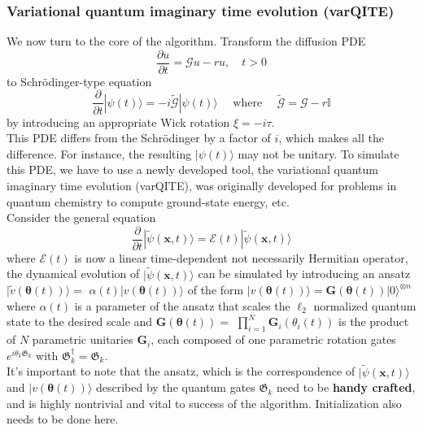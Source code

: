 \documentclass[11pt]{article}
\theoremstyle{definition}
\begin{document}
\subsubsection{Variational quantum imaginary time evolution (varQITE)}
We now turn to the core of the algorithm. Transform the diffusion PDE
$$
\frac{\partial u}{\partial t}=\mathcal{G} u-r u, \quad t>0
$$
to Schrödinger-type equation
$$
\frac{\partial}{\partial t}|\psi(t)\rangle=-i \tilde{\mathcal{G}}|\psi(t)\rangle \quad \text { where } \quad \tilde{\mathcal{G}}=\mathcal{G}-r \mathbb{I}
$$
by introducing an appropriate Wick rotation $\xi=-i \tau$.\\

This PDE differs from the Schrödinger by a factor of $i$, which makes all the difference. For instance, the resulting $|\psi(t)\rangle$ may not be unitary. To simulate this PDE, we have to use a newly developed tool, the variational quantum imaginary time evolution (varQITE)\cite{yuan_theory_2019}, was originally developed for problems in quantum chemistry to compute ground-state energy, etc. \\

Consider the general equation
$$
\frac{\partial}{\partial t}|\tilde{\psi}(\mathbf{x}, t)\rangle=\mathcal{E}(t)|\tilde{\psi}(\mathbf{x}, t)\rangle
$$
where $\mathcal{E}(t)$ is now a linear time-dependent not necessarily Hermitian operator, the dynamical evolution of $|\tilde{\psi}(\mathbf{x}, t)\rangle$ can be simulated by introducing an ansatz $|\tilde{v}(\boldsymbol{\theta}(t))\rangle=$ $\alpha(t)|v(\boldsymbol{\theta}(t))\rangle$ of the form $|v(\boldsymbol{\theta}(t))\rangle=\mathbf{G}(\boldsymbol{\theta}(t))|0\rangle^{\otimes n}$ where $\alpha(t)$ is a parameter of the ansatz that scales the $\ell_2$ normalized quantum state to the desired scale and $\mathbf{G}(\boldsymbol{\theta}(t))=$ $\prod_{i=1}^N \mathbf{G}_i\left(\theta_i(t)\right)$ is the product of $N$ parametric unitaries $\mathbf{G}_i$, each composed of one parametric rotation gates $e^{i \theta_k \mathfrak{G}_k}$ with $\mathfrak{G}_k^{\dagger}=\mathfrak{G}_k$.\\

It's important to note that the ansatz, which is the correspondence of $|\tilde{\psi}(\mathbf{x}, t)\rangle$ and $|v(\boldsymbol{\theta}(t))\rangle$ described by the quantum gates $\mathfrak{G}_k$ need to be \textbf{handy crafted}, and is highly nontrivial and vital to success of the algorithm. Initialization also needs to be done here.\\
\end{document}

